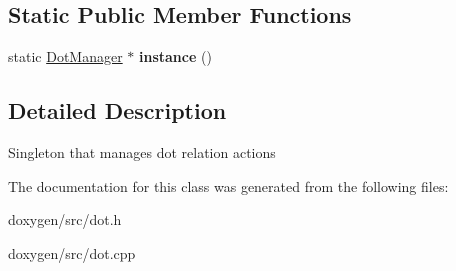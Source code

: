 \subsection*{Static Public Member Functions}
\begin{DoxyCompactItemize}
\item 
\mbox{\label{class_dot_manager_af6eb5ac505738992f7440e4a5948997f}} 
static \mbox{\hyperlink{class_dot_manager}{Dot\+Manager}} $\ast$ {\bfseries instance} ()
\end{DoxyCompactItemize}


\subsection{Detailed Description}
Singleton that manages dot relation actions 

The documentation for this class was generated from the following files\+:\begin{DoxyCompactItemize}
\item 
doxygen/src/dot.\+h\item 
doxygen/src/dot.\+cpp\end{DoxyCompactItemize}

